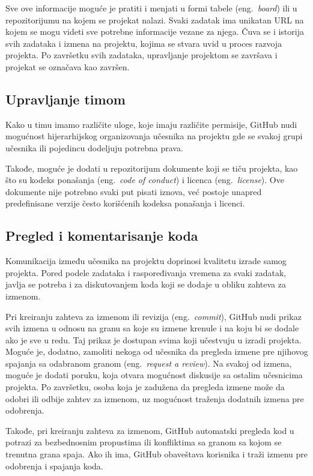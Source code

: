 \documentclass[12pt]{report}
\begin{document}
Sve ove informacije moguće je pratiti i menjati u formi tabele (eng.\ \textit{board}) ili u repozitorijumu na kojem se projekat nalazi. Svaki zadatak ima unikatan URL na kojem se mogu videti sve potrebne informacije vezane za njega. Čuva se i istorija svih zadataka i izmena na projektu, kojima se stvara uvid u proces razvoja projekta. Po završetku svih zadataka, upravljanje projektom se završava i projekat se označava kao završen.

\subsection{Upravljanje timom}
Kako u timu imamo različite uloge, koje imaju različite permisije, GitHub nudi mogućnost hijerarhijskog organizovanja učesnika na projektu gde se svakoj grupi učesnika ili pojedincu dodeljuju potrebna prava.

Takođe, moguće je dodati u repozitorijum dokumente koji se tiču projekta, kao što su kodeks ponašanja (eng.\ \textit{code of conduct}) i licenca (eng.\ \textit{license}). Ove dokumente nije potrebno svaki put pisati iznova, već postoje unapred predefinisane verzije često korišćenih kodeksa ponašanja i licenci.

\subsection{Pregled i komentarisanje koda}
Komunikacija između učesnika na projektu doprinosi kvalitetu izrade samog projekta. Pored podele zadataka i raspoređivanja vremena za svaki zadatak, javlja se potreba i za diskutovanjem koda koji se dodaje u obliku zahteva za izmenom.

Pri kreiranju zahteva za izmenom ili revizija (eng.\ \textit{commit}), GitHub nudi prikaz svih izmena u odnosu na granu sa koje su izmene krenule i na koju bi se dodale ako je sve u redu. Taj prikaz je dostupan svima koji učestvuju u izradi projekta. Moguće je, dodatno, zamoliti nekoga od učesnika da pregleda izmene pre njihovog spajanja sa odabranom granom (eng.\ \textit{request a review}). Na svakoj od izmena, moguće je dodati poruku, koja otvara mogućnost diskusije sa ostalim učesnicima projekta. Po završetku, osoba koja je zadužena da pregleda izmene može da odobri ili odbije zahtev za izmenom, uz mogućnost traženja dodatnih izmena pre odobrenja.

Takođe, pri kreiranju zahteva za izmenom, GitHub automatski pregleda kod u potrazi za bezbednosnim propustima ili konfliktima sa granom sa kojom se trenutna grana spaja. Ako ih ima, GitHub obaveštava korisnika i traži izmenu pre odobrenja i spajanja koda.
\end{document}
